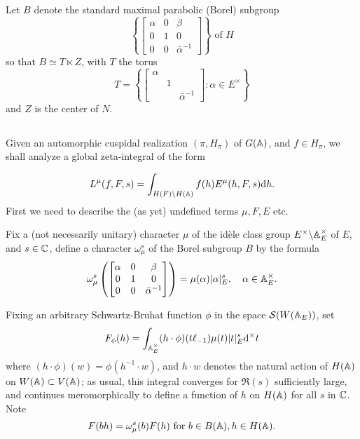 Let $B$ denote the standard maximal parabolic (Borel) subgroup
\[
    \left\{
    \begin{bmatrix}
        \alpha & 0 & \beta \\ 0 & 1 & 0 \\ 0 & 0 & \bar{\alpha}^{-1}
    \end{bmatrix}
    \right\} \text{ of }H
\]
so that $B \simeq T \ltimes Z$, with $T$ the torus
\[
    T = \left\{
        \begin{bmatrix}
            \alpha & & \\ & 1 & \\ & & \bar{\alpha}^{-1}
        \end{bmatrix}: \alpha \in E^\times
    \right\}
\]
and $Z$ is the center of $N$.


\subsection{}
\label{sec:3.2}

Given an automorphic cuspidal realization $(\pi, H_\pi)$ of $G(\mathbb{A})$, and $f \in H_\pi$, we shall analyze a global zeta-integral of the form

\begin{equation}
    \label{eqn:3.2.1}
    L^\mu(f, F, s) = \int_{H(F) \backslash H(\mathbb{A})} f(h) E^\mu(h, F, s) \mathrm{d} h.
\end{equation}
First we need to describe the (as yet) undefined terms $\mu, F, E$ etc.

Fix a (not necessarily unitary) character $\mu$ of the id\`ele class group $E^\times \backslash \mathbb{A}_E^\times$ of $E$, and $s \in \mathbb{C}$, define a character $\omega_\mu^s$ of the Borel subgroup $B$ by the formula
\begin{equation}
\label{eqn:3.2.2}
    \omega_\mu^s\left(
        \begin{bmatrix}
            \alpha & 0 & \beta \\ 0 & 1 & 0 \\ 0 & 0 & \bar{\alpha}^{-1}
        \end{bmatrix}
    \right) = \mu(\alpha) |\alpha|_E^s, \quad \alpha \in \mathbb{A}_E^\times.
\end{equation}

Fixing an arbitrary Schwartz-Bruhat function $\phi$ in the space $\mathcal{S}(W({\mathbb{A}_E}))$, set
\begin{equation}
    \label{eqn;3.2.3}
    F_\phi(h) = \int_{\mathbb{A}_E^\times} (h\cdot \phi)(t \ell_{-1})\mu(t) |t|_E^s \mathrm{d}^\times t
\end{equation}
where $(h \cdot \phi)(w) = \phi(h^{-1} \cdot w)$, and $h \cdot w$ denotes the natural action of $H(\mathbb{A})$ on $W(\mathbb{A}) \subset V(\mathbb{A})$;
as usual, this integral converges for $\Re(s)$ sufficiently large, and continues meromorphically to define a function of $h$ on $H(\mathbb{A})$ for all $s$ in $\mathbb{C}$.
Note
\[
    F(bh) = \omega_{\mu}^{s}(b)F(h) \text{ for } b \in B(\mathbb{A}), h \in H(\mathbb{A}).
\]


